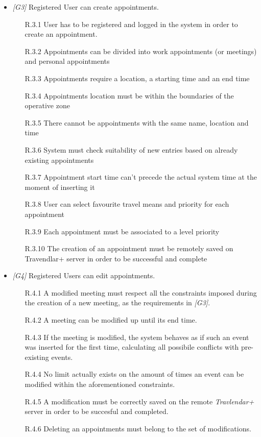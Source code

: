 \begin{itemize}
	
	\item \textit{[G3]} Registered User can create appointments.
		\begin{itemize}
			\item [R.3.1] User has to be registered and logged in the system in order to create an
appointment.
			\item [R.3.2] Appointments can be divided into work appointments (or meetings) and personal appointments
			\item [R.3.3] Appointments require a location, a starting time and an end time
			\item [R.3.4] Appointments location must be within the boundaries of the operative zone
			\item [R.3.5] There cannot be appointments with the same name, location and time
			\item [R.3.6] System must check suitability of new entries based on already existing appointments
			\item [R.3.7] Appointment start time can't precede the actual system time at the moment of inserting it                                 							
			\item [R.3.8] User can select favourite travel means and priority for each appointment
			\item [R.3.9] Each appointment must be associated to a level priority
			\item [R.3.10] The creation of an appointment must be remotely saved on Travendlar+ server in order to be successful and complete
		\end{itemize}


	\item \textit{[G4]} Registered Users can edit appointments.
		 \begin{itemize}
		 	\item  [R.4.1] A modified meeting must respect all the constraints imposed during the creation of a new meeting, as the requirements in \textit{[G3]}.
		 	\item [R.4.2] A meeting can be modified up until its end time.
		 	\item [R.4.3] If the meeting is modified, the system behaves as if such an event was inserted for the first time, calculating all possibile conflicts with pre-existing events.
		 	\item [R.4.4] No limit actually exists on the amount of times an event can be modified within the aforementioned constraints.
		 	\item [R.4.5] A modification must be correctly saved on the remote \textit{Travlendar+} server in order to be succesful and completed.
		 	\item [R.4.6] Deleting an appointments must belong to the set of modifications.
		 \end{itemize}


\end{itemize}
